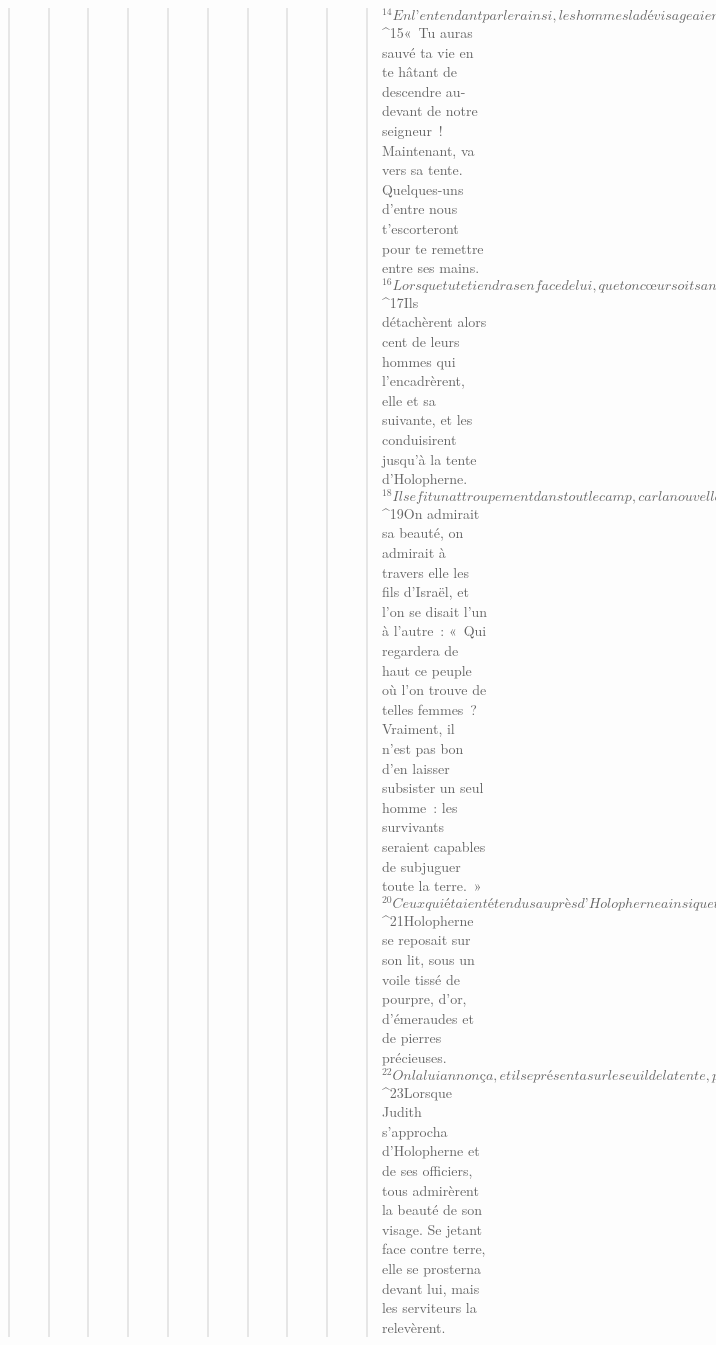 \begin{verse}
\begin{verse}
\begin{verse}
\begin{verse}
\begin{verse}
\begin{verse}
\begin{verse}
\begin{verse}
\begin{verse}
\begin{verse}
${}^{14}En l’entendant parler ainsi, les hommes la dévisageaient, et sa beauté les plongeait dans une vive admiration. Ils lui dirent : 
${}^{15}« Tu auras sauvé ta vie en te hâtant de descendre au-devant de notre seigneur ! Maintenant, va vers sa tente. Quelques-uns d’entre nous t’escorteront pour te remettre entre ses mains. 
${}^{16}Lorsque tu te tiendras en face de lui, que ton cœur soit sans crainte. Répète-lui ce que tu viens de dire, et il te traitera bien. » 
${}^{17}Ils détachèrent alors cent de leurs hommes qui l’encadrèrent, elle et sa suivante, et les conduisirent jusqu’à la tente d’Holopherne.
${}^{18}Il se fit un attroupement dans tout le camp, car la nouvelle de sa présence s’était répandue dans les tentes. On fit cercle autour d’elle, comme elle se tenait à l’extérieur de la tente d’Holopherne, en attendant de lui être annoncée. 
${}^{19}On admirait sa beauté, on admirait à travers elle les fils d’Israël, et l’on se disait l’un à l’autre : « Qui regardera de haut ce peuple où l’on trouve de telles femmes ? Vraiment, il n’est pas bon d’en laisser subsister un seul homme : les survivants seraient capables de subjuguer toute la terre. »
${}^{20}Ceux qui étaient étendus auprès d’Holopherne ainsi que tous ses officiers sortirent enfin. Ils introduisirent Judith dans la tente. 
${}^{21}Holopherne se reposait sur son lit, sous un voile tissé de pourpre, d’or, d’émeraudes et de pierres précieuses. 
${}^{22}On la lui annonça, et il se présenta sur le seuil de la tente, précédé de flambeaux d’argent. 
${}^{23}Lorsque Judith s’approcha d’Holopherne et de ses officiers, tous admirèrent la beauté de son visage. Se jetant face contre terre, elle se prosterna devant lui, mais les serviteurs la relevèrent.
      

\end{verse}
\end{verse}
\end{verse}
\end{verse}
\end{verse}
\end{verse}
\end{verse}
\end{verse}
\end{verse}
\end{verse}
